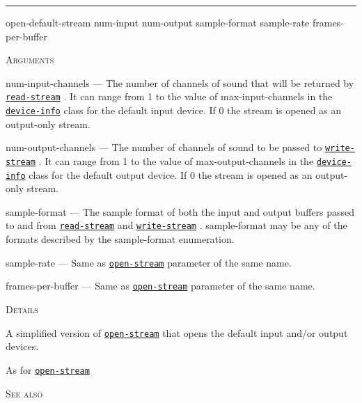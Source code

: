\documentclass[a4paper]{report}
\begin{document}
  

    \rule{\linewidth}{0.1mm}
    
    \label{portaudio__fun__open-default-stream}
    \begin{defun}[Function]
    open-default-stream num-input num-output sample-format sample-rate frames-per-buffer


    
    \bigskip
    \textsc{Arguments}

num-input-channels
	--- The number of channels of sound that will be returned by \hyperref[portaudio__fun__read-stream]{\texttt{read-stream}}
  . It can range from 1 to the value of max-input-channels in the \hyperref[portaudio__class__device-info]{\texttt{device-info}}
   class for the default input device. If 0 the stream is opened as an output-only stream.

num-output-channels
	--- The number of channels of sound to be passed to \hyperref[portaudio__fun__write-stream]{\texttt{write-stream}}
  . It can range from 1 to the value of max-output-channels in the \hyperref[portaudio__class__device-info]{\texttt{device-info}}
   class for the default output device. If 0 the stream is opened as an output-only stream.

sample-format
	--- The sample format of both the input and output buffers passed to and from \hyperref[portaudio__fun__read-stream]{\texttt{read-stream}}
   and \hyperref[portaudio__fun__write-stream]{\texttt{write-stream}}
  . sample-format may be any of the formats described by the sample-format enumeration.

sample-rate
	--- Same as \hyperref[portaudio__fun__open-stream]{\texttt{open-stream}}
   parameter of the same name.

frames-per-buffer
	--- Same as \hyperref[portaudio__fun__open-stream]{\texttt{open-stream}}
   parameter of the same name.




	
    \bigskip
    \textsc{Details}

A simplified version of \hyperref[portaudio__fun__open-stream]{\texttt{open-stream}}
   that opens the default input and/or output devices.



As for \hyperref[portaudio__fun__open-stream]{\texttt{open-stream}}
  


      
    \bigskip
    \textsc{See also}



\end{defun}
\end{document}
